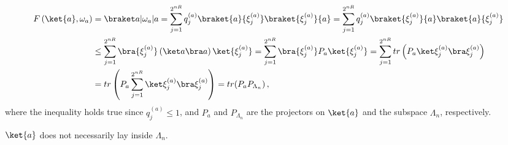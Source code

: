 \documentclass[12pt,a4paper]{article}
\begin{document}
        \begin{align*}
            F \left( \ket{a}, \omega_a \right) &= \brakett{a}{\omega_a}{a} =
            \sum_{j=1}^{2^{nR}} q_j^{(a)} \braket{a}{\xi_j^{(a)}}
            \braket{\xi_j^{(a)}}{a}
            = \sum_{j=1}^{2^{nR}} q_j^{(a)} \braket{\xi_j^{(a)}}{a}
            \braket{a}{\xi_j^{(a)}} \\
            &\leq \sum_{j=1}^{2^{nR}} \bra{\xi_j^{(a)}} \left(\ketbra{a}\right) \ket{\xi_j^{(a)}}
            = \sum_{j=1}^{2^{nR}} \bra{\xi_j^{(a)}} P_a \ket{\xi_j^{(a)}}
            = \sum_{j=1}^{2^{nR}} tr \left( P_a \ketbra{\xi_j^{(a)}} \right)
            \\
            &= tr \left( P_a \sum_{j=1}^{2^{nR}} \ketbra{\xi_j^{(a)}} \right)
            = tr(P_a P_{\Lambda_n}) \,,
        \end{align*}
        where the inequality holds true since $q_j^{(a)} \leq 1$, and $P_a$
        and $P_{\Lambda_n}$ are the projectors on $\ket{a}$ and the subspace
        $\Lambda_n$, respectively.

        \begin{remark}
            $\ket{a}$ does not necessarily lay inside $\Lambda_n$.
        \end{remark}
\end{document}
